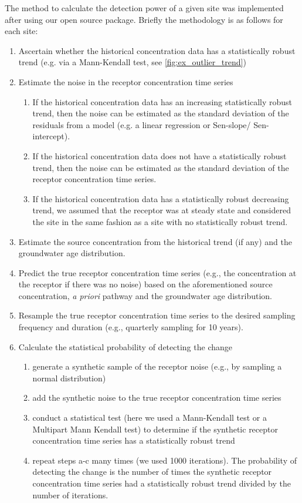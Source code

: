 The method to calculate the detection power of a given site was implemented after \citet{dumont_determining_nodate}
using our open source package\citep{dumont_komanawagw_detect_power_2023}.
Briefly the methodology is as follows for each site:
\begin{enumerate}
    \item Ascertain whether the historical concentration data has a statistically robust trend (e.g. via a Mann-Kendall test, see \autoref{fig:ex_outlier_trend})
    \item Estimate the noise in the receptor concentration time series
    \begin{enumerate}
        \item If the historical concentration data has an increasing statistically robust trend, then the noise can be estimated as the standard deviation of the residuals from a model (e.g. a linear regression or Sen-slope/ Sen-intercept).
        \item If the historical concentration data does not have a statistically robust trend, then the noise can be estimated as the standard deviation of the receptor concentration time series.
        \item If the historical concentration data has a statistically robust decreasing trend, we assumed that the receptor was at steady state and considered the site in the same fashion as a site with no statistically robust trend.
    \end{enumerate}
    \item Estimate the source concentration from the historical trend (if any) and the groundwater age distribution.
    \item Predict the true receptor concentration time series (e.g., the concentration at the receptor if there was no noise) based on the aforementioned source concentration, \textit{a priori} pathway and the groundwater age distribution.
    \item Resample the true receptor concentration time series to the desired sampling frequency and duration (e.g., quarterly sampling for 10 years).
    \item Calculate the statistical probability of detecting the change
    \begin{enumerate}
        \item generate a synthetic sample of the receptor noise (e.g., by sampling a normal distribution)
        \item add the synthetic noise to the true receptor concentration time series
        \item conduct a statistical test (here we used a Mann-Kendall test or a Multipart Mann Kendall test) to determine if the synthetic receptor concentration time series has a statistically robust trend
        \item repeat steps a-c many times (we used 1000 iterations). The probability of detecting the change is the number of times the synthetic receptor concentration time series had a statistically robust trend divided by the number of iterations.
    \end{enumerate}
\end{enumerate}

